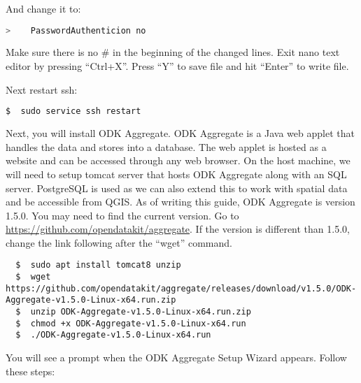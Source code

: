 And change it to:

\begin{lstlisting}[language=bash]
  >    PasswordAuthenticion no
\end{lstlisting}

Make sure there is no \# in the beginning of the changed lines. Exit nano text editor by pressing ``Ctrl+X''. Press ``Y'' to save file and hit ``Enter'' to write file.

Next restart ssh:

\begin{lstlisting}[language=bash]
  $  sudo service ssh restart
\end{lstlisting}

Next, you will install ODK Aggregate. ODK Aggregate is a Java web applet that handles the data and stores into a database. The web applet is hosted as a website and can be accessed through any web browser. On the host machine, we will need to setup tomcat server that hosts ODK Aggregate along with an SQL server. PostgreSQL is used as we can also extend this to work with spatial data and be accessible from QGIS. As of writing this guide, ODK Aggregate is version 1.5.0. You may need to find the current version. Go to \url{https://github.com/opendatakit/aggregate}. If the version is different than 1.5.0, change the link following after the ``wget'' command.

\begin{lstlisting}
  $  sudo apt install tomcat8 unzip
  $  wget https://github.com/opendatakit/aggregate/releases/download/v1.5.0/ODK-Aggregate-v1.5.0-Linux-x64.run.zip
  $  unzip ODK-Aggregate-v1.5.0-Linux-x64.run.zip
  $  chmod +x ODK-Aggregate-v1.5.0-Linux-x64.run
  $  ./ODK-Aggregate-v1.5.0-Linux-x64.run
\end{lstlisting}

You will see a prompt when the ODK Aggregate Setup Wizard appears. Follow these steps:

